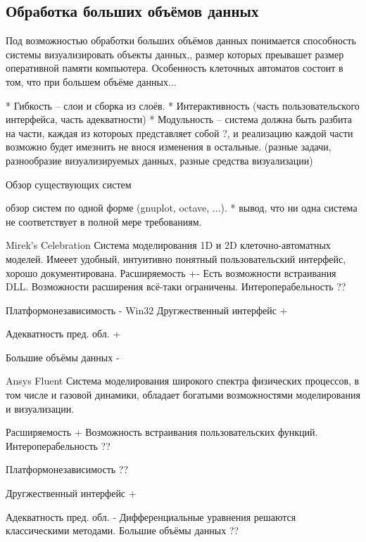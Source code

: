 \documentclass[a4paper,12pt]{extarticle}
\begin{document}
\subsection{Обработка больших объёмов данных}
Под возможностью обработки больших объёмов данных понимается способность системы визуализировать объекты данных,, размер которых преывашет размер оперативной памяти компьютера. Особенность клеточных автоматов состоит в том, что при большем объёме данных... 

* Гибкость -- слои и сборка из слоёв.
* Интерактивность (часть пользовательского интерфейса, часть адекватности)
* Модульность -- система должна быть разбита на части, каждая из котороых представляет собой ?, и реализацию каждой части возможно будет имезнить не внося изменения в остальные. (разные задачи, разнообразие визуализируемых данных, разные средства визуализации)



\begin{section}{Обзор существующих систем}

обзор систем по одной форме (gnuplot, octave, ...).
* вывод, что ни одна система не соответствует в полной мере требованиям.

\begin{subsection}{Mirek's Celebration}
    Система моделирования 1D и 2D клеточно-автоматных моделей.
    Имееет удобный, интуитивно понятный пользовательский интерфейс, хорошо документирована.
    Расширяемость
    +-
    Есть возможности встраивания DLL. Возможности расширения всё-таки ограничены.
    Интероперабельность
    ??

    Платформонезависимость
    -
    Win32
    Другжественный интерфейс
    +

    Адекватность пред. обл.
    +

    Большие объёмы данных
-
\end{subsection}

\begin{subsection}{Ansys Fluent}
    Система моделирования широкого спектра физических процессов, в том числе и газовой динамики, обладает богатыми возможностями моделирования и визуализации.

    Расширяемость
    +
    Возможность встраивания пользовательских функций.
    Интероперабельность
    ??

    Платформонезависимость
    ??

    Другжественный интерфейс
    +

    Адекватность пред. обл.
    -
    Дифференциальные уравнения решаются классическими методами.
    Большие объёмы данных
    ??
\end{subsection}

\end{section}
\end{document}
